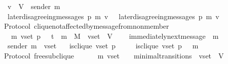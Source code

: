 \begin{isabellebody}
\ \ {\isasymlongrightarrow}\ v\ {\isasymin}\ V\ {\isacharminus}\ {\isacharbraceleft}sender\ m{\isacharprime}{\isacharbraceright}\isanewline
\ \ {\isasymlongrightarrow}\ later{\isacharunderscore}disagreeing{\isacharunderscore}messages\ {\isacharparenleft}p{\isacharcomma}\ m{\isacharcomma}\ v{\isacharcomma}\ {\isasymsigma}{\isacharparenright}\ {\isacharequal}\ later{\isacharunderscore}disagreeing{\isacharunderscore}messages\ {\isacharparenleft}p{\isacharcomma}\ m{\isacharcomma}\ v{\isacharcomma}\ {\isasymsigma}{\isacharprime}{\isacharparenright}{\isachardoublequoteclose}\isanewline
%
\isadelimproof
\ \ %
\endisadelimproof
%
\isatagproof
{}\isamarkupfalse%
%
\endisatagproof
{\isafoldproof}%
%
\isadelimproof
\isanewline
%
\endisadelimproof
\isanewline
\isanewline
\isanewline
{}\isamarkupfalse%
\ {\isacharparenleft}\ Protocol{\isacharparenright}\ clique{\isacharunderscore}not{\isacharunderscore}affected{\isacharunderscore}by{\isacharunderscore}message{\isacharunderscore}from{\isacharunderscore}non{\isacharunderscore}member\ {\isacharcolon}\isanewline
\ \ {\isachardoublequoteopen}{\isasymforall}\ {\isasymsigma}\ m\ v{\isacharunderscore}set\ p{\isachardot}\ {\isasymsigma}\ {\isasymin}\ {\isasymSigma}t\ {\isasymand}\ m\ {\isasymin}\ M\ {\isasymand}\ v{\isacharunderscore}set\ {\isasymsubseteq}\ V\ \isanewline
\ \ {\isasymlongrightarrow}\ immediately{\isacharunderscore}next{\isacharunderscore}message\ {\isacharparenleft}{\isasymsigma}{\isacharcomma}\ m{\isacharparenright}\isanewline
\ \ {\isasymlongrightarrow}\ sender\ m\ {\isasymnotin}\ v{\isacharunderscore}set\isanewline
\ \ {\isasymlongrightarrow}\ is{\isacharunderscore}clique\ {\isacharparenleft}v{\isacharunderscore}set{\isacharcomma}\ p{\isacharcomma}\ {\isasymsigma}{\isacharparenright}\ \isanewline
\ \ {\isasymlongrightarrow}\ is{\isacharunderscore}clique\ {\isacharparenleft}v{\isacharunderscore}set{\isacharcomma}\ p{\isacharcomma}\ {\isasymsigma}\ {\isasymunion}\ {\isacharbraceleft}m{\isacharbraceright}{\isacharparenright}{\isachardoublequoteclose}\isanewline
%
\isadelimproof
\ \ %
\endisadelimproof
%
\isatagproof
{}\isamarkupfalse%
%
\endisatagproof
{\isafoldproof}%
%
\isadelimproof
\isanewline
%
\endisadelimproof
\isanewline
\isanewline
\isanewline
\isanewline
\isanewline
\isanewline
\isanewline
\isanewline
\isanewline
{}\isamarkupfalse%
\ {\isacharparenleft}\ Protocol{\isacharparenright}\ free{\isacharunderscore}sub{\isacharunderscore}clique\ {\isacharcolon}\isanewline
\ \ {\isachardoublequoteopen}{\isasymforall}\ {\isasymsigma}\ {\isasymsigma}{\isacharprime}\ m{\isacharprime}\ v{\isacharunderscore}set{\isachardot}\ {\isacharparenleft}{\isasymsigma}{\isacharcomma}\ {\isasymsigma}{\isacharprime}{\isacharparenright}\ {\isasymin}\ minimal{\isacharunderscore}transitions\ {\isasymand}\ v{\isacharunderscore}set\ {\isasymsubseteq}\ V\isanewline

\end{isabellebody}
